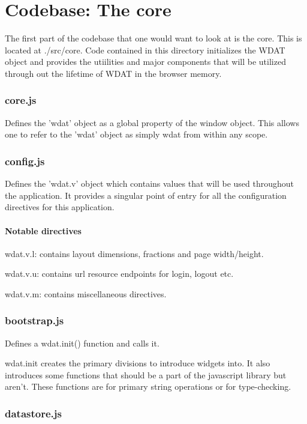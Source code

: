 \chapter{Codebase: The core}

The first part of the codebase that one would want to look at is the
core.  This is located at ./src/core.  Code contained in this
directory initializes the WDAT object and provides the utiilities and
major components that will be utilized through out the lifetime of
WDAT in the browser memory.


\subsection{core.js}

Defines the 'wdat' object as a global property of the window object.
This allows one to refer to the 'wdat' object as simply wdat from
within any scope.

\subsection{config.js}

Defines the 'wdat.v' object which contains values that will be used
throughout the application.  It provides a singular point of entry for
all the configuration directives for this application.

\subsubsection{Notable directives}

wdat.v.l: contains layout dimensions, fractions and page width/height.

wdat.v.u: contains url resource endpoints for login, logout etc.

wdat.v.m: contains miscellaneous directives.

\subsection{bootstrap.js}

Defines a wdat.init() function and calls it.

wdat.init creates the primary divisions to introduce widgets into. It
also introduces some functions that should be a part of the javascript
library but aren't.  These functions are for primary string operations
or for type-checking.


\subsection{datastore.js}

